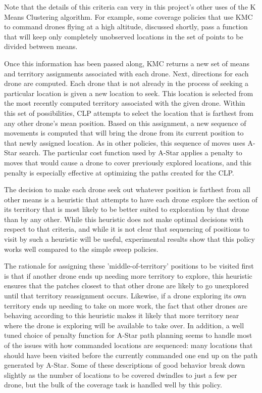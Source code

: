 Note that the details of this criteria can very in this project's other uses of the K Means Clustering algorithm. For example, some coverage policies that use KMC to command drones flying at a high altitude, discussed shortly, pass a function that will keep only completely unobserved locations in the set of points to be divided between means.

Once this information has been passed along, KMC returns a new set of means and territory assignments associated with each drone. Next, directions for each drone are computed. Each drone that is not already in the process of seeking a particular location is given a new location to seek. This location is selected from the most recently computed territory associated with the given drone. Within this set of possibilities, CLP attempts to select the location that is farthest from any other drone's mean position. Based on this assignment, a new sequence of movements is computed that will bring the drone from its current position to that newly assigned location. As in other policies, this sequence of moves uses A-Star search. The particular cost function used by A-Star applies a penalty to moves that would cause a drone to cover previously explored locations, and this penalty is especially effective at optimizing the paths created for the CLP.

The decision to make each drone seek out whatever position is farthest from all other means is a heuristic that attempts to have each drone explore the section of its territory that is most likely to be better suited to exploration by that drone than by any other. While this heuristic does not make optimal decisions with respect to that criteria, and while it is not clear that sequencing of positions to visit by such a heuristic will be useful, experimental results show that this policy works well compared to the simple sweep policies.

The rationale for assigning these 'middle-of-territory' positions to be visited first is that if another drone ends up needing more territory to explore, this heuristic ensures that the patches closest to that other drone are likely to go unexplored until that territory reassignment occurs. Likewise, if a drone exploring its own territory ends up needing to take on more work, the fact that other drones are behaving according to this heuristic makes it likely that more territory near where the drone is exploring will be available to take over. In addition, a well tuned choice of penalty function for A-Star path planning seems to handle most of the issues with how commanded locations are sequenced: many locations that should have been visited before the currently commanded one end up on the path generated by A-Star. Some of these descriptions of good behavior break down slightly as the number of locations to be covered dwindles to just a few per drone, but the bulk of the coverage task is handled well by this policy.

